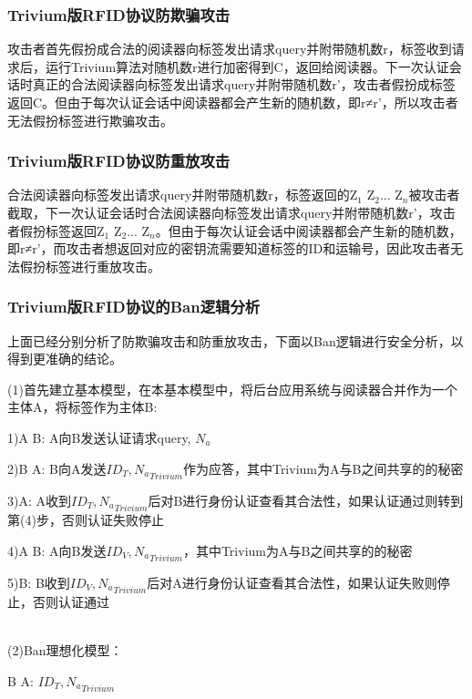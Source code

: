 \subsubsection{Trivium版RFID协议防欺骗攻击}

攻击者首先假扮成合法的阅读器向标签发出请求query并附带随机数r，标签收到请求后，运行Trivium算法对随机数r进行加密得到C，返回给阅读器。下一次认证会话时真正的合法阅读器向标签发出请求query并附带随机数r’，攻击者假扮成标签返回C。但由于每次认证会话中阅读器都会产生新的随机数，即r≠r’，所以攻击者无法假扮标签进行欺骗攻击。

\subsubsection{Trivium版RFID协议防重放攻击}

合法阅读器向标签发出请求query并附带随机数r，标签返回的Z$_{1}$ Z$_{2}$... Z$_{n}$被攻击者截取，下一次认证会话时合法阅读器向标签发出请求query并附带随机数r’，攻击者假扮标签返回Z$_{1}$ Z$_{2}$... Z$_{n}$。但由于每次认证会话中阅读器都会产生新的随机数，即r≠r’，而攻击者想返回对应的密钥流需要知道标签的ID和运输号，因此攻击者无法假扮标签进行重放攻击。

\subsubsection{Trivium版RFID协议的Ban逻辑分析}

上面已经分别分析了防欺骗攻击和防重放攻击，下面以Ban逻辑进行安全分析，以得到更准确的结论。

(1)首先建立基本模型，在本基本模型中，将后台应用系统与阅读器合并作为一个主体A，将标签作为主体B:

1)A \rightarrow B: A向B发送认证请求{query, $N_{a}$}

2)B \rightarrow A: B向A发送${ID_{T}, N_{a}}_{Trivium}$作为应答，其中Trivium为A与B之间共享的的秘密

3)A: A收到${ID_{T}, N_{a}}_{Trivium}$后对B进行身份认证查看其合法性，如果认证通过则转到第(4)步，否则认证失败停止

4)A \rightarrow B: A向B发送${ID_{V}, N_{a}}_{Trivium}$，其中Trivium为A与B之间共享的的秘密

5)B: B收到${ID_{V}, N_{a}}_{Trivium}$后对A进行身份认证查看其合法性，如果认证失败则停止，否则认证通过

\\

(2)Ban理想化模型：

B \rightarrow A: ${ID_{T}, N_{a}}_{Trivium}$

